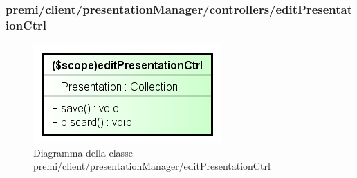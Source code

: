 \subsubsection{premi/client/presentationManager/controllers/editPresentationCtrl}
\begin{figure}[h]
\begin{center}
\includegraphics[scale=0.90]{img/diacla/editPresentationCtrl.png}
\caption{Diagramma della classe premi/client/presentationManager/editPresentationCtrl}
\end{center}
\end{figure}

